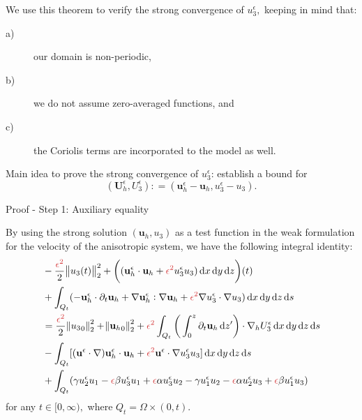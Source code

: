 \documentclass{beamer}
\newcommand*\diff{\mathop{}\!\mathrm{d}}
\begin{document}
\begin{frame}
We use this theorem to verify the strong convergence of $u_3^\epsilon,$ \textcolor{mediumred-violet}{keeping in mind that:}
\begin{description}
\item[a)] our domain is non-periodic,
\item[b)] we do not assume zero-averaged functions, and
\item[c)] the Coriolis terms are incorporated to the model as well.
\end{description}

Main idea to prove the strong convergence of $u^\epsilon_3$: establish a bound for \begin{equation} \nonumber (\mathbf{U}_h^\epsilon, U_3^\epsilon): = (\mathbf{u}_h^\epsilon - \mathbf{u}_h, u_3^\epsilon - u_3).\end{equation}

\end{frame}

\begin{frame}{Proof - Step 1: Auxiliary equality}

\changefontsizes{10pt}

By using the strong solution $(\mathbf{u}_h,u_3)$ as a test function in the weak formulation for the velocity of the anisotropic system, we have the following integral identity:
%
\begin{equation} \nonumber
  \begin{split}
    & - \frac{\textcolor{jasper}{\epsilon^2}}{2} \norm{u_3(t)}_2^2 + \bigg ( (\mathbf{u}_h^\epsilon \cdot \mathbf{u}_h + \textcolor{jasper}{\epsilon^2} u_3^\epsilon u_3) \diff x \diff y \diff z  \bigg ) (t) \\
    & + \int_{Q_t} (-\mathbf{u}_h^\epsilon \cdot \partial_t \mathbf{u}_h + \nabla \mathbf{u}_h^\epsilon : \nabla \mathbf{u}_h + \textcolor{jasper}{\epsilon^2} \nabla u_3^\epsilon \cdot \nabla u_3) \diff x \diff y \diff z \diff s \\
    & = \frac{\textcolor{jasper}{\epsilon^2}}{2} \norm{{u_3}_0}_2^2 + \norm{{\mathbf{u}_h}_0}_2^2 + \textcolor{jasper}{\epsilon^2} \int_{Q_t} \bigg ( \int_0^z \partial_t \mathbf{u}_h \diff z' \bigg ) \cdot \nabla_h U_3^\epsilon \diff x \diff y \diff z \diff s \\
    & - \int_{Q_t} [(\mathbf{u}^\epsilon \cdot \nabla) \mathbf{u}_h^\epsilon \cdot \mathbf{u}_h + \textcolor{jasper}{\epsilon^2} \mathbf{u}^\epsilon \cdot \nabla u_3^\epsilon u_3] \diff x \diff y \diff z \diff s \\
    & + \int_{Q_t}  ( \gamma u_2^\epsilon u_1 - \textcolor{jasper}{\epsilon} \beta u_3^\epsilon u_1 + \textcolor{jasper}{\epsilon} \alpha u_3^\epsilon u_2 - \gamma u_1^\epsilon u_2 - \textcolor{jasper}{\epsilon} \alpha u^\epsilon_2 u_3 + \textcolor{jasper}{\epsilon} \beta u_1^\epsilon u_3)
  \end{split}
\end{equation}
%
\hspace{0.5cm} for any $t \in [0, \infty),$ where $Q_t = \Omega \times (0,t).$

\end{frame}
\end{document}
